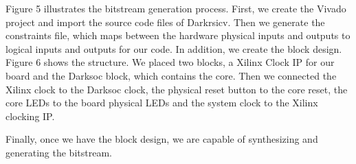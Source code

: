 Figure 5 illustrates the bitstream generation process. First, we create the Vivado project and import the source code files of Darkrsicv. Then we generate the constraints file, which maps between the hardware physical inputs and outputs to logical inputs and outputs for our code. In addition, we create the block design. Figure 6 shows the structure. We placed two blocks, a Xilinx Clock IP for our board and the Darksoc block, which contains the core. Then we connected the Xilinx clock to the Darksoc clock, the physical reset button to the core reset, the core LEDs to the board physical LEDs and the system clock to the Xilinx clocking IP.

Finally, once we have the block design, we are capable of synthesizing and generating the bitstream. 

\iffalse
[1] http://parallel.princeton.edu/openpiton/paper.html
[2] https://github.com/PrincetonUniversity/openpiton/blob/openpiton/docs/openpiton_ariane_blockdiag.png?raw=true
[3] https://www2.eecs.berkeley.edu/Pubs/TechRpts/2016/EECS-2016-17.html
[4] https://github.com/chipsalliance/chisel3
[5] Slides
[6] Slides

\fi